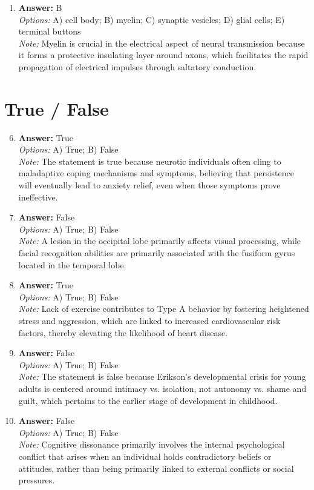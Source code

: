 \documentclass[12pt]{article}
\begin{document}
\begin{enumerate}[label=\arabic*.]
\item \textbf{Answer:} B
\\ \textit{Options:} A) cell body; B) myelin; C) synaptic vesicles; D) glial cells; E) terminal buttons
\\ \textit{Note:} Myelin is crucial in the electrical aspect of neural transmission because it forms a protective insulating layer around axons, which facilitates the rapid propagation of electrical impulses through saltatory conduction.
\end{enumerate}

\section*{True / False}
\begin{enumerate}[label=\arabic*.]
\setcounter{enumi}{5}
\item \textbf{Answer:} True
\\ \textit{Options:} A) True; B) False
\\ \textit{Note:} The statement is true because neurotic individuals often cling to maladaptive coping mechanisms and symptoms, believing that persistence will eventually lead to anxiety relief, even when those symptoms prove ineffective.
\item \textbf{Answer:} False
\\ \textit{Options:} A) True; B) False
\\ \textit{Note:} A lesion in the occipital lobe primarily affects visual processing, while facial recognition abilities are primarily associated with the fusiform gyrus located in the temporal lobe.
\item \textbf{Answer:} True
\\ \textit{Options:} A) True; B) False
\\ \textit{Note:} Lack of exercise contributes to Type A behavior by fostering heightened stress and aggression, which are linked to increased cardiovascular risk factors, thereby elevating the likelihood of heart disease.
\item \textbf{Answer:} False
\\ \textit{Options:} A) True; B) False
\\ \textit{Note:} The statement is false because Erikson's developmental crisis for young adults is centered around intimacy vs. isolation, not autonomy vs. shame and guilt, which pertains to the earlier stage of development in childhood.
\item \textbf{Answer:} False
\\ \textit{Options:} A) True; B) False
\\ \textit{Note:} Cognitive dissonance primarily involves the internal psychological conflict that arises when an individual holds contradictory beliefs or attitudes, rather than being primarily linked to external conflicts or social pressures.
\end{enumerate}
\end{document}
